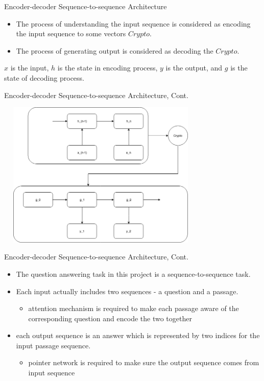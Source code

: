 \documentclass{beamer}
\begin{document}
\begin{frame}{Encoder-decoder Sequence-to-sequence Architecture}
\begin{itemize}
    \item The process of understanding the input sequence is considered as encoding the input sequence to some vectors $Crypto$.
    \item The process of generating output is considered as decoding the $Crypto$.
\end{itemize}

\begin{examples}
$x$ is the input, $h$ is the state in encoding process, $y$ is the output, and $g$ is the state of decoding process.
\end{examples}

\end{frame}

\begin{frame}{Encoder-decoder Sequence-to-sequence Architecture, Cont.}
    \begin{center}
        \includegraphics[width=10cm, height=7cm]{figures/encoderDecoder.png}
    \end{center}
\end{frame}

\begin{frame}{Encoder-decoder Sequence-to-sequence Architecture, Cont.}
    \begin{itemize}
        \item The question answering task in this project is a sequence-to-sequence task.
        \item Each input actually includes two sequences - a question and a passage.
            \begin{itemize}
                \item attention mechanism is required to make each passage aware of the corresponding question and encode the two together
            \end{itemize}
        \item each output sequence is an answer which is represented by two indices for the input passage sequence.
            \begin{itemize}
                \item pointer network is required to make sure the output sequence comes from input sequence
            \end{itemize}
    \end{itemize}

\end{frame}
\end{document}
